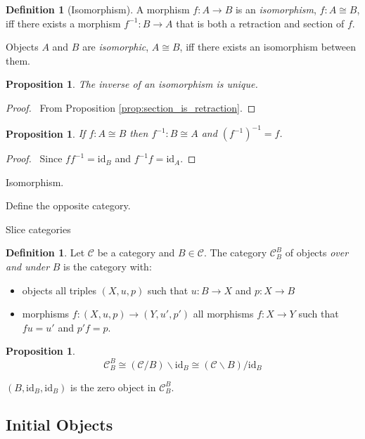 \documentclass{book}
\let\qed\relax
\newtheorem{prop}[ax]{Proposition}
\theoremstyle{definition}
\newtheorem{df}[ax]{Definition}
\newcommand{\id}[1]{\ensuremath{\mathrm{id}_{#1}}}
\newcommand{\inv}[1]{\ensuremath{{#1}^{-1}}}
\begin{document}
\begin{df}[Isomorphism]
A morphism $f : A \rightarrow B$ is an \emph{isomorphism}, $f : A \cong B$, iff there exists a morphism $\inv{f} : B \rightarrow A$ that is both a retraction and section of $f$.

Objects $A$ and $B$ are \emph{isomorphic}, $A \cong B$, iff there exists an isomorphism between them.
\end{df}

\begin{prop}
The inverse of an isomorphism is unique.
\end{prop}

\begin{proof}
\pf\ From Proposition \ref{prop:section_is_retraction}. \qed
\end{proof}

\begin{prop}
If $f : A \cong B$ then $\inv{f} : B \cong A$ and $\inv{(\inv{f})} = f$.
\end{prop}

\begin{proof}
\pf\ Since $f\inv{f} = \id{B}$ and $\inv{f}f = \id{A}$. \qed
\end{proof}

Isomorphism.

Define the opposite category.

Slice categories

\begin{df}
Let $\mathcal{C}$ be a category and $B \in \mathcal{C}$. The category $\mathcal{C}_B^B$ of objects \emph{over and under} $B$ is the category with:
\begin{itemize}
\item objects all triples $(X,u,p)$ such that $u : B \rightarrow X$ and $p : X \rightarrow B$
\item morphisms $f : (X,u,p) \rightarrow (Y,u',p')$ all morphisms $f : X \rightarrow Y$ such that $fu=u'$ and $p'f=p$.
\end{itemize}
\end{df}

\begin{prop}
\[ \mathcal{C}_B^B \cong (\mathcal{C} / B) \backslash \id{B} \cong (\mathcal{C} \backslash B) / \id{B} \]
\end{prop}

$(B, \id{B}, \id{B})$ is the zero object in $\mathcal{C}_B^B$.

\subsection{Initial Objects}
\end{document}
